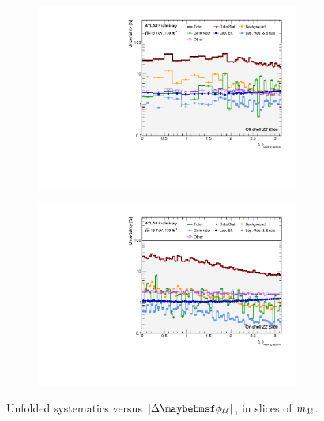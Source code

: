 \begin{figure}[hp]
    \begin{subfigure}{.49\textwidth}\centering\includegraphics[width = 0.95\textwidth]{Figures/m4l/Systematics/Unfolded/UnfoldedSys_dPhiLeadLep_vs_M4l_Stack_Paper2.pdf}\end{subfigure}
    \begin{subfigure}{.49\textwidth}\centering\includegraphics[width = 0.95\textwidth]{Figures/m4l/Systematics/Unfolded/UnfoldedSys_dPhiLeadLep_vs_M4l_Stack_Paper3.pdf}\end{subfigure}
    \caption{Unfolded systematics versus $\dPhill$, in slices of $m_{4\ell}$.}
\end{figure}

